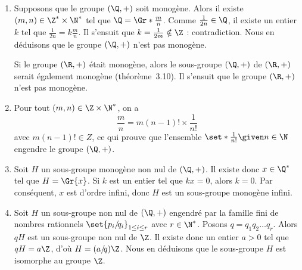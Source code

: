 \begin{enumerate}
  \item 
    Supposons que le groupe $(\Q,+)$ soit monogène.
    Alors il existe $(m,n)\in\Z^*\times\N^*$ tel que $\Q = \Gr*{\frac{m}{n}}$.
    Comme $\frac{1}{2n}\in\Q$, il existe un entier $k$ tel que $\frac{1}{2n} = k\frac{m}{n}$.
    Il s'ensuit que $k = \frac{1}{2m}\notin\Z$ : contradiction.
    Nous en déduisons que le groupe $(\Q,+)$ n'est pas monogène.

    Si le groupe $(\R,+)$ était monogène, alors le sous-groupe $(\Q,+)$ de $(\R,+)$ serait également monogène (théorème~3.10).
    Il s'ensuit que le groupe $(\R,+)$ n'est pas monogène.
  \item
    Pour tout $(m,n)\in\Z\times\N^*$, on a 
    \[
      \frac{m}{n} = m(n - 1)!\times\frac{1}{n!}
    \]
    avec $m(n - 1)!\in Z$, ce qui prouve que l'ensemble $\set*{\frac{1}{n!}\given n\in\N}$ engendre le groupe $(\Q,+)$.
  \item
    Soit $H$ un sous-groupe monogène non nul de $(\Q,+)$.
    Il existe donc $x\in\Q^*$ tel que $H = \Gr{x}$.
    Si $k$ est un entier tel que $kx = 0$, alors $k = 0$.
    Par conséquent, $x$ est d'ordre infini, donc $H$ est un sous-groupe monogène infini.
  \item
    Soit $H$ un sous-groupe non nul de $(\Q,+)$ engendré par la famille fini de nombres rationnels $\set{p_i/\!q_i}_{1\leq i\leq r}$ avec $r\in\N^*$. 
    Posons $q = q_1q_2\dots q_r$.
    Alors $qH$ est un sous-groupe non nul de $\Z$.
    Il existe donc un entier $a > 0$ tel que $qH = a\Z$, d'où $H = (a/\!q)\Z$.
    Nous en déduisons que le sous-groupe $H$ est isomorphe au groupe $\Z$.
\end{enumerate}
